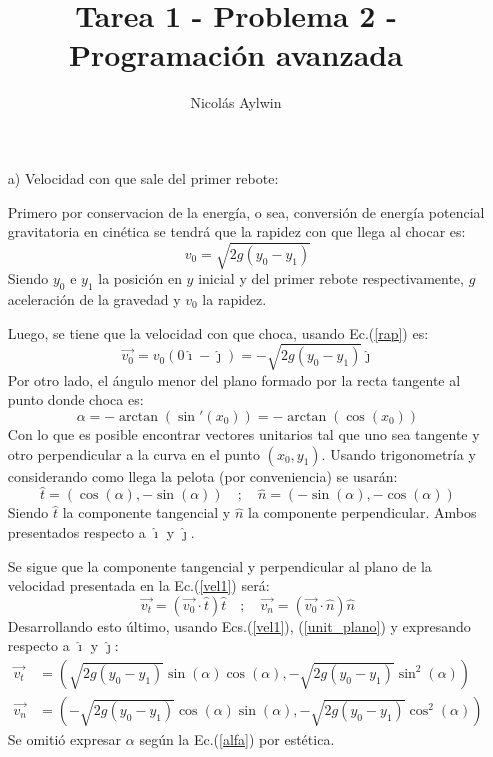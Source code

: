 \documentclass[12pt]{article}
\title{Tarea 1 - Problema 2 - Programación avanzada}
\author{Nicolás Aylwin}
\date{}
\begin{document}
\maketitle
\begin{itemize}
\item[a)]Velocidad con que sale del primer rebote:

Primero por conservacion de la energía, o sea, conversión de energía potencial gravitatoria en cinética se tendrá que la rapidez con que llega al chocar es:
\begin{equation}
\label{rap}
v_0=\sqrt{2g(y_0-y_1)}
\end{equation}
Siendo $y_0$ e $y_1$ la posición en $y$ inicial y del primer rebote respectivamente, $g$ aceleración de la gravedad y $v_0$ la rapidez.

Luego, se tiene que la velocidad con que choca, usando Ec.(\ref{rap}) es:
\begin{equation}
\label{vel1}
\vec{v_0}=v_0(0\hat{\imath}-\hat{\jmath})=-\sqrt{2g(y_0-y_1)}\hat{\jmath}
\end{equation}
Por otro lado, el ángulo menor del plano formado por la recta tangente al punto donde choca es:
\begin{equation}
\label{alfa}
\alpha=-\arctan(\sin'(x_0))=-\arctan(\cos(x_0))
\end{equation}
Con lo que es posible encontrar vectores unitarios tal que uno sea tangente y otro perpendicular a la curva en el punto $(x_0,y_1)$. Usando trigonometría y considerando como llega la pelota (por conveniencia) se usarán:
\begin{equation}
\label{unit_plano}
\hat{t}=(\cos(\alpha),-\sin(\alpha)) \quad;\quad \hat{n}=(-\sin(\alpha),-\cos(\alpha))
\end{equation}
Siendo $\hat{t}$ la componente tangencial y $\hat{n}$ la componente perpendicular. Ambos presentados respecto a $\hat{\imath}$ y $\hat{\jmath}$.

Se sigue que la componente tangencial y perpendicular al plano de la velocidad presentada en la Ec.(\ref{vel1}) será:
\begin{equation*}
\vec{v_t}=(\vec{v_0}\cdot\hat{t})\hat{t}\quad ;\quad \vec{v_n}=(\vec{v_0}\cdot\hat{n})\hat{n}
\end{equation*}
Desarrollando esto último, usando Ecs.(\ref{vel1}), (\ref{unit_plano}) y expresando respecto a $\hat{\imath}$ y $\hat{\jmath}$:
\begin{align}
\vec{v_t}&=\left(\sqrt{2g(y_0-y_1)}\sin(\alpha)\cos(\alpha),-\sqrt{2g(y_0-y_1)}\sin^{2}(\alpha)\right) \\
\vec{v_n}&=\left(-\sqrt{2g(y_0-y_1)}\cos(\alpha)\sin(\alpha),-\sqrt{2g(y_0-y_1)}\cos^{2}(\alpha)\right)
\end{align}
Se omitió expresar $\alpha$ según la Ec.(\ref{alfa}) por estética.


\end{itemize}
\end{document}
